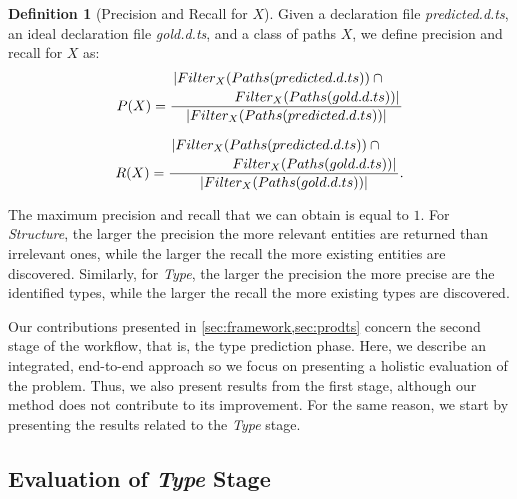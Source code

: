 \documentclass[sigplan,10pt,review,anonymous]{acmart} %
\theoremstyle{plain}
\theoremstyle{remark}
\theoremstyle{definition}
\newtheorem{defn}{Definition}[section]
\begin{document}
\begin{defn}[Precision and Recall for $X$] \label{def:precision_recall}
  Given a declaration file \textit{predicted.d.ts},
  an ideal declaration file \textit{gold.d.ts}, and a class of paths $X$,
  we define precision and recall for $X$ as:
  \begin{equation}
    P(X) =
    \dfrac{\splitdfrac{|Filter_X(Paths(predicted.d.ts)) \cap {}}{Filter_X(Paths(gold.d.ts)) |}}{|Filter_X(Paths(predicted.d.ts)) |}
  \end{equation}
  
  \begin{equation}
    R(X) =
    \dfrac{\splitdfrac{|Filter_X(Paths(predicted.d.ts)) \cap {}} {Filter_X(Paths(gold.d.ts)) |}}
    {|Filter_X(Paths(gold.d.ts))|}.
  \end{equation}
\end{defn}
%
The maximum precision and recall that we can obtain is equal to $1$.
%
For \textit{Structure}, the larger the precision the more relevant entities are returned than irrelevant ones,
while the larger the recall the more existing entities are discovered.
%
Similarly, for \textit{Type}, the larger the precision the more precise are the identified types,
while the larger the recall the more existing types are discovered.

Our contributions presented in \cref{sec:framework,sec:prodts} concern the second stage of the workflow,
that is, the type prediction phase.
%
Here, we describe an integrated, end-to-end approach so we focus on presenting a holistic evaluation of the problem.
%
Thus, we also present results from the first stage,
although our method does not contribute to its improvement. 
%
For the same reason, we start by presenting the results related to the \textit{Type} stage.

\subsection{Evaluation of \textit{Type} Stage}
\end{document}
